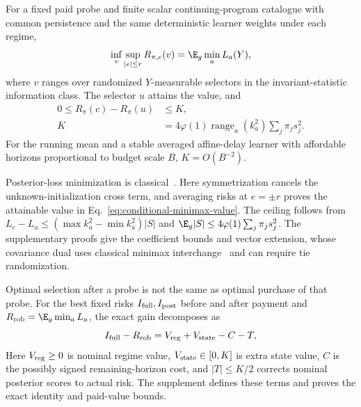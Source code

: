 \begin{theorem}
For a fixed paid probe and finite scalar continuing-program catalogue with common persistence and the same deterministic learner weights under each regime,
\begin{equation}
\inf_v\sup_{|e|\le r}R_{\pi,e}(v)=\E_g\min_aL_a(Y),
\label{eq:conditional-minimax-value}
\end{equation}
where $v$ ranges over randomized $Y$-measurable selectors in the invariant-statistic information class.
The selector $u$ attains the value, and
\begin{align}
0\le R_\pi(c)-R_\pi(u)&\le K,\nonumber\\
K&=4\varphi(1)\operatorname{range}_a(k_a^2)\sum_j\pi_js_j^2.
\label{eq:state-selection-ceiling-main}
\end{align}
For the running mean and a stable averaged affine-delay learner with affordable horizons proportional to budget scale $B$, $K=O(B^{-2})$.
\label{thm:conditional-value}
\end{theorem}

Posterior-loss minimization is classical~\cite{moustakides2012joint,vasconcelos2020observation,reinhard2026minimax}.
Here symmetrization cancels the unknown-initialization cross term, and averaging risks at $e=\pm r$ proves the attainable value in Eq.~\eqref{eq:conditional-minimax-value}.
The ceiling follows from $L_c-L_u\le(\max k_a^2-\min k_a^2)|S|$ and $\E_g|S|\le4\varphi(1)\sum_j\pi_js_j^2$.
The supplementary proofs give the coefficient bounds and vector extension, whose covariance dual uses classical minimax interchange~\cite{sion1958minimax} and can require tie randomization.

Optimal selection after a probe is not the same as optimal purchase of that probe.
For the best fixed risks $I_{\rm full},I_{\rm post}$ before and after payment and $R_{\rm rob}=\E_g\min_aL_a$, the exact gain decomposes as
\[
I_{\rm full}-R_{\rm rob}=V_{\rm reg}+V_{\rm state}-C-T,
\]
Here $V_{\rm reg}\ge0$ is nominal regime value, $V_{\rm state}\in[0,K]$ is extra state value, $C$ is the possibly signed remaining-horizon cost, and $|T|\le K/2$ corrects nominal posterior scores to actual risk.
The supplement defines these terms and proves the exact identity and paid-value bounds.

